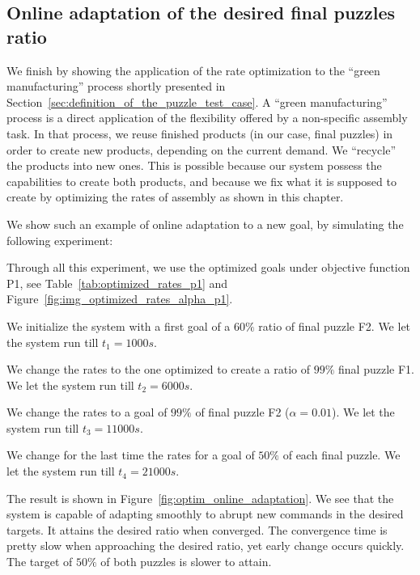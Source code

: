     \subsection{Online adaptation of the desired final puzzles ratio} %
    \label{sub:online_adaptation_of_the_desired_final_puzzles_ratio}
        We finish by showing the application of the rate optimization to the ``green manufacturing'' process shortly presented in Section~\ref{sec:definition_of_the_puzzle_test_case}. A ``green manufacturing'' process is a direct application of the flexibility offered by a non-specific assembly task. In that process, we reuse finished products (in our case, final puzzles) in order to create new products, depending on the current demand. We ``recycle'' the products into new ones. This is possible because our system possess the capabilities to create both products, and because we fix what it is supposed to create by optimizing the rates of assembly as shown in this chapter.

        We show such an example of online adaptation to a new goal, by simulating the following experiment:

        \begin{my_itemize}
            \item Through all this experiment, we use the optimized goals under objective function P1, see Table~\ref{tab:optimized_rates_p1} and Figure~\ref{fig:img_optimized_rates_alpha_p1}.
            \item We initialize the system with a first goal of a $60\%$ ratio of final puzzle F2. We let the system run till $t_1 = 1000 s$.
            \item We change the rates to the one optimized to create a ratio of $99\%$ final puzzle F1. We let the system run till $t_2 = 6000 s$.
            \item We change the rates to a goal of $99\%$ of final puzzle F2 ($\alpha=0.01$). We let the system run till $t_3 = 11000 s$.
            \item We change for the last time the rates for a goal of $50\%$ of each final puzzle. We let the system run till $t_4 = 21000 s$.
        \end{my_itemize}

        The result is shown in Figure~\ref{fig:optim_online_adaptation}. We see that the system is capable of adapting smoothly to abrupt new commands in the desired targets. It attains the desired ratio when converged. The convergence time is pretty slow when approaching the desired ratio, yet early change occurs quickly. The target of $50\%$ of both puzzles is slower to attain.

